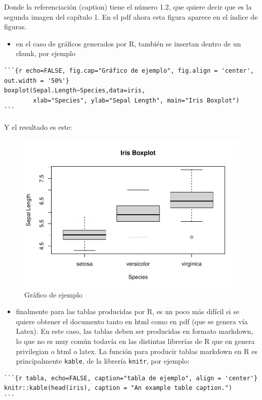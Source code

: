 \documentclass[12pt,twoside]{templates/facsothesis}
\providecommand{\tightlist}{%
  \setlength{\itemsep}{0pt}\setlength{\parskip}{0pt}}
\begin{document}
Donde la referenciación (caption) tiene el número 1.2, que quiere decir que es la segunda imagen del capítulo 1. En el pdf ahora esta figura aparece en el índice de figuras.

\begin{itemize}
\tightlist
\item
  en el caso de gráficos generados por R, también se insertan dentro de un chunk, por ejemplo
\end{itemize}

\begin{verbatim}
```{r echo=FALSE, fig.cap="Gráfico de ejemplo", fig.align = 'center', out.width = '50%'}
boxplot(Sepal.Length~Species,data=iris,
        xlab="Species", ylab="Sepal Length", main="Iris Boxplot")
```
\end{verbatim}

Y el resultado es este:

\begin{figure}

{\centering \includegraphics[width=0.5\linewidth]{tesis_files/figure-latex/unnamed-chunk-1-1} 

}

\caption{Gráfico de ejemplo}\label{fig:unnamed-chunk-1}
\end{figure}

\begin{itemize}
\tightlist
\item
  finalmente para las tablas producidas por R, es un poco más difícil si se quiere obtener el documento tanto en html como en pdf (que se genera vía Latex). En este caso, las tablas deben ser producidas en formato markdown, lo que no es muy común todavía en las distintas librerías de R que en genera privilegian o html o latex. La función para producir tablas markdown en R es principalmente \texttt{kable}, de la librería \texttt{knitr}, por ejemplo:
\end{itemize}

\begin{verbatim}
```{r tabla, echo=FALSE, caption="tabla de ejemplo", align = 'center'}
knitr::kable(head(iris), caption = "An example table caption.")
```
\end{verbatim}
\end{document}
